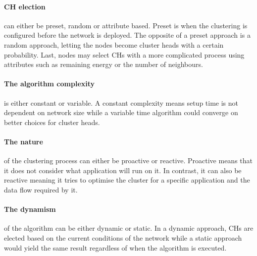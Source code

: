 \paragraph*{CH election} can either be preset, random or attribute based. Preset is when the clustering is configured before the network is deployed. The opposite of a preset approach is a random approach, letting the nodes become cluster heads with a certain probability. Last, nodes may select CHs with a more complicated process using attributes such as remaining energy or the number of neighbours.


\paragraph*{The algorithm complexity} is either constant or variable. A constant complexity means setup time is not dependent on network size while a variable time algorithm could converge on better choices for cluster heads. 

\paragraph*{The nature} of the clustering process can either be proactive or reactive. Proactive means that it does not consider what application will run on it. In contrast, it can also be reactive meaning it tries to optimise the cluster for a specific application and the data flow required by it.

\paragraph*{The dynamism} of the algorithm can be either dynamic or static. In a dynamic approach, CHs are elected based on the current conditions of the network while a static approach would yield the same result regardless of when the algorithm is executed.


